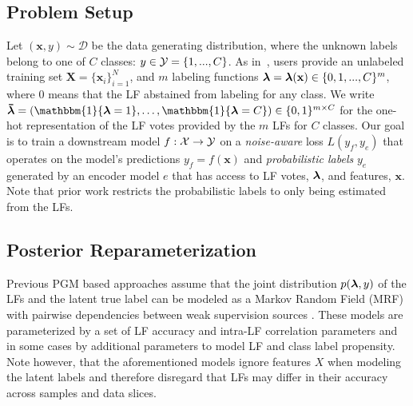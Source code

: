 \documentclass{article}
\newcommand{\indicator}[1]{\mathbbm{1}\{ #1 \}}
\newcommand{\features}{\mathbf{x}}
\newcommand{\lambdaOnehot}{\accentset{\rule{.4em}{.8pt}}{\lfs}}
\begin{document}
\subsection{Problem Setup} \label{ProblemSetup}
Let $(\features,y) \sim \mathcal{D}$ be the data generating distribution, where the unknown labels belong to one of $C$ classes: $y\in \operatorname{\mathcal{Y}} = \{1, ..., C\}$.
As in~\cite{DP}, users provide an unlabeled training set $\mathbf{X} = \{ \mathbf{x}_i\}_{i=1}^N$, and $m$ labeling functions $\operatorname{\bm{\lambda}} = \operatorname{\bm{\lambda}}( \mathbf{x}) \in \{0, 1, ..., C \}^m$, where $0$ means that the LF abstained from labeling for any class.
We write $\lambdaOnehot= \brackets{\indicator{\lfs = 1}, \dots,  \indicator{\lfs = C}}\in \{0,1\} ^{m \times C}$ for the one-hot representation of the LF votes provided by the $m$ LFs for $C$ classes. Our goal is to train a downstream model $f: \mathcal{X} \rightarrow \operatorname{\mathcal{Y}}$ on a \emph{noise-aware} loss $L(y_f, y_e)$ that operates on the model's predictions $y_f = f(\features)$ and \emph{probabilistic labels} $ y_e$ generated by an encoder model $e$ that has access to LF votes, $\operatorname{\bm{\lambda}}$, and features, $\features$. Note that prior work restricts the probabilistic labels to only being estimated from the LFs.\subsection{Posterior Reparameterization}
Previous PGM based approaches assume that the joint distribution $p(\operatorname{\bm{\lambda}}, y)$ of the LFs and the latent true label can be modeled as a Markov Random Field (MRF) with pairwise dependencies between weak supervision sources \cite{DP, Snorkel, Multitask, triplets, TripletsMean}. These models are parameterized by a set of LF accuracy and intra-LF correlation parameters and in some cases by additional parameters to model LF and class label propensity.
Note however, that the aforementioned models ignore features $X$ when modeling the latent labels and therefore disregard that LFs may differ in their accuracy across samples and data slices.
 
\end{document}
